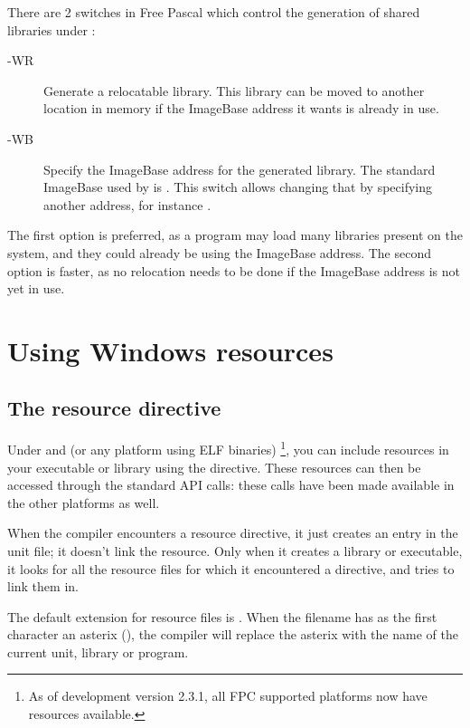 There are 2 switches in Free Pascal which control the generation of
shared libraries under \windows:
\begin{description}
\item[-WR] Generate a relocatable library. This library can be moved to
another location in memory if the ImageBase address it wants is already
in use.
\item[-WB] Specify the ImageBase address for the generated library.
The standard ImageBase used by \fpc is . This switch
allows changing that by specifying another address, for instance
.
\end{description}
The first option is preferred, as a program may load many libraries
present on the system, and they could already be using the ImageBase
address. The second option is faster, as no relocation needs to be
done if the ImageBase address is not yet in use.


\chapter{Using Windows resources}
\label{ch:windres}

\section{The resource directive }

Under \windows and \linux (or any platform using ELF binaries)
\footnote{As of development version 2.3.1, all FPC supported 
platforms now have resources available.}, 
you can include resources in your executable or library using 
the  directive. These resources can then
be accessed through the standard \windows API calls: these calls
have been made available in the other platforms as well.


When the compiler encounters a resource directive, it just creates an
entry in the unit  file; it doesn't link the resource. Only
when it creates a library or executable, it looks for all the resource
files for which it encountered a directive, and tries to link them in.

The default extension for resource files is . When the
filename has as the first character an asterix (\var{*}), the
compiler will replace the asterix with the name of the current unit,
library or program.

